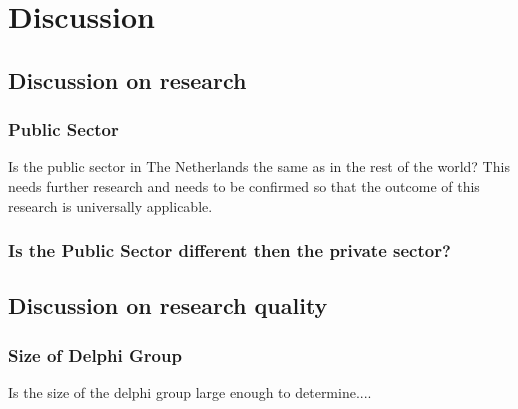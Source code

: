 \chapter{Discussion}
\label{ch:discussion}


\section{Discussion on research}
\label{sec:discussiononresearch}


\subsection{Public Sector}
\label{sub:discussionpublicsector}
Is the public sector in The Netherlands the same as in the rest of the world? This needs further research and needs to be confirmed so that the outcome of this research is universally applicable.

\subsection{Is the Public Sector different then the private sector?}
\label{sub:discussionpublicvsprivate}
\lipsum[1]


\section{Discussion on research quality}
\label{sec:discusssionresearchquality}
\subsection{Size of Delphi Group}
\label{sub:discussionsizeofdelphi}
Is the size of the delphi group large enough to determine....